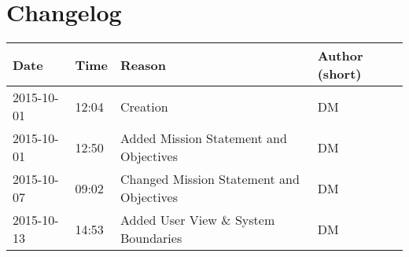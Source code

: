 \chapter{Changelog}

\begin{table}[h]
	\begin{tabularx}{\textwidth}{llll}
		Date & Time & Reason & Author (short)\\
		\toprule
		2015-10-01 & 12:04 & Creation & DM\\
		2015-10-01 & 12:50 & Added Mission Statement and Objectives & DM\\
		2015-10-07 & 09:02 & Changed Mission Statement and Objectives & DM\\
		2015-10-13 & 14:53 & Added User View \& System Boundaries & DM\\
	\end{tabularx}
\end{table}

